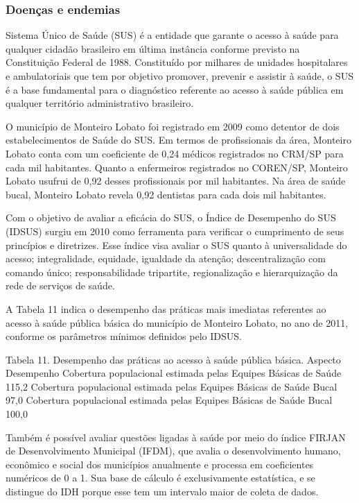 \subsubsection{Doenças e endemias}

Sistema Único de Saúde (SUS) é a entidade que garante o acesso à saúde para qualquer cidadão brasileiro em última instância conforme previsto na Constituição Federal de 1988. Constituído por milhares de unidades hospitalares e ambulatoriais que tem por objetivo promover, prevenir e assistir à saúde, o SUS é a base fundamental para o diagnóstico referente ao acesso à saúde pública em qualquer território administrativo brasileiro. 

O município de Monteiro Lobato foi registrado em 2009 como detentor de dois estabelecimentos de Saúde do SUS. Em termos de profissionais da área, Monteiro Lobato conta com um coeficiente de 0,24 médicos registrados no CRM/SP para cada mil habitantes. Quanto a enfermeiros registrados no COREN/SP, Monteiro Lobato usufrui de 0,92 desses profissionais por mil habitantes. Na área de saúde bucal, Monteiro Lobato revela 0,92 dentistas para cada dois mil habitantes.

Com o objetivo de avaliar a eficácia do SUS, o Índice de Desempenho do SUS (IDSUS) surgiu em 2010 como ferramenta para verificar o cumprimento de seus princípios e diretrizes. Esse índice visa avaliar o SUS quanto à universalidade do acesso; integralidade, equidade, igualdade da atenção; descentralização com comando único; responsabilidade tripartite, regionalização e hierarquização da rede de serviços de saúde.

A Tabela 11 indica o desempenho das práticas mais imediatas referentes ao acesso à saúde pública básica do município de Monteiro Lobato, no ano de 2011, conforme os parâmetros mínimos definidos pelo IDSUS.

Tabela 11. Desempenho das práticas ao acesso à saúde pública básica.
Aspecto	Desempenho
Cobertura populacional estimada pelas Equipes Básicas de Saúde	115,2%
Cobertura populacional estimada pelas Equipes Básicas de Saúde Bucal	97,0%
Cobertura populacional estimada pelas Equipes Básicas de Saúde Bucal	100,0%

Também é possível avaliar questões ligadas à saúde por meio do índice FIRJAN de Desenvolvimento Municipal (IFDM), que avalia o desenvolvimento humano, econômico e social dos municípios anualmente e processa em coeficientes numéricos de 0 a 1. Sua base de cálculo é exclusivamente estatística, e se distingue do IDH porque esse tem um intervalo maior de coleta de dados. 		

